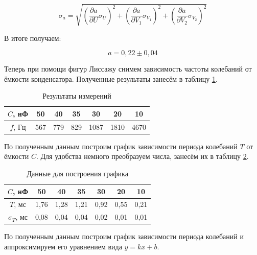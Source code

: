 \documentclass[a4paper,12pt]{article} %
\begin{document}
\[ \sigma_a = \sqrt{\left(\frac{\partial a}{\partial U}\sigma_U\right)^2+\left(\frac{\partial a}{\partial V_1}\sigma_{V_1}\right)^2+\left(\frac{\partial a}{\partial V_2}\sigma_{V_2}\right)^2} \]

В итоге получаем:

\[ \boxed{a = 0,22 \pm 0,04} \]

Теперь при помощи фигур Лиссажу снимем зависимость частоты колебаний от ёмкости конденсатора. Полученные результаты занесём в таблицу \ref{tab:tab3}.

\begin{table}[H]
	\centering
	\begin{tabular}{|c|c|c|c|c|c|c|}
		\hline
		$ C $, нФ & 50  & 40  & 35  & 30   & 20   & 10   \\ \hline
		$ f $, Гц & 567 & 779 & 829 & 1087 & 1810 & 4670 \\ \hline
	\end{tabular}
	\caption{Результаты измерений}
	\label{tab:tab3}
\end{table}

По полученным данным построим график зависимости периода колебаний $ T $ от ёмкости $ C $. Для удобства немного преобразуем числа, занесём их в таблицу \ref{tab:tab4}.

\begin{table}[H]
	\centering
	\begin{tabular}{|c|c|c|c|c|c|c|}
		\hline
		$ C $, нФ    & 50   & 40   & 35   & 30   & 20   & 10   \\ \hline
		$ T $, мс    & 1,76 & 1,28 & 1,21 & 0,92 & 0,55 & 0,21 \\ \hline
		$ \sigma_T $, мс & 0,08 & 0,04 & 0,04 & 0,02 & 0,01 & 0,01 \\ \hline
	\end{tabular}
	\caption{Данные для построения графика}
	\label{tab:tab4}
\end{table}

По полученным данным построим график зависимости периода колебаний и аппроксимируем его уравнением вида $ y = kx+b $.
\end{document}
